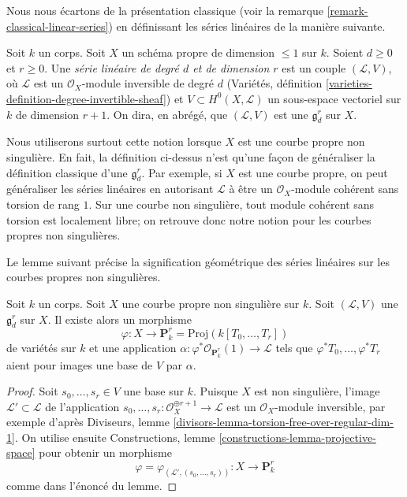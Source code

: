 \noindent
Nous nous écartons de la présentation classique (voir la remarque \ref{remark-classical-linear-series}) en définissant les séries linéaires de la manière suivante.

\begin{definition}
\label{definition-linear-series}
Soit $k$ un corps. Soit $X$ un schéma propre de dimension $\leq 1$ sur $k$. Soient $d \geq 0$ et $r \geq 0$. Une {\it série linéaire de degré $d$ et de dimension $r$} est un couple $(\mathcal{L}, V)$, où $\mathcal{L}$ est un $\mathcal{O}_X$-module inversible de degré $d$ (Variétés, définition \ref{varieties-definition-degree-invertible-sheaf}) et $V \subset H^0(X, \mathcal{L})$ un sous-espace vectoriel sur $k$ de dimension $r + 1$. On dira, en abrégé, que $(\mathcal{L}, V)$ est une {\it $\mathfrak g^r_d$} sur $X$.
\end{definition}

\noindent
Nous utiliserons surtout cette notion lorsque $X$ est une courbe propre non singulière. En fait, la définition ci-dessus n'est qu'une façon de généraliser la définition classique d'une $\mathfrak g^r_d$. Par exemple, si $X$ est une courbe propre, on peut généraliser les séries linéaires en autorisant $\mathcal{L}$ à être un $\mathcal{O}_X$-module cohérent sans torsion de rang $1$. Sur une courbe non singulière, tout module cohérent sans torsion est localement libre; on retrouve donc notre notion pour les courbes propres non singulières.

\medskip\noindent
Le lemme suivant précise la signification géométrique des séries linéaires sur les courbes propres non singulières.

\begin{lemma}
\label{lemma-linear-series}
Soit $k$ un corps. Soit $X$ une courbe propre non singulière sur $k$. Soit $(\mathcal{L}, V)$ une $\mathfrak g^r_d$ sur $X$. Il existe alors un morphisme $$
\varphi : X \longrightarrow \mathbf{P}^r_k = \text{Proj}(k[T_0, \ldots, T_r])
$$ de variétés sur $k$ et une application $\alpha : \varphi^*\mathcal{O}_{\mathbf{P}^r_k}(1) \to \mathcal{L}$ tels que $\varphi^*T_0, \ldots, \varphi^*T_r$ aient pour images une base de $V$ par $\alpha$.
\end{lemma}

\begin{proof}
Soit $s_0, \ldots, s_r \in V$ une base sur $k$. Puisque $X$ est non singulière, l'image $\mathcal{L}' \subset \mathcal{L}$ de l'application $s_0, \ldots, s_r : \mathcal{O}_X^{\oplus r + 1} \to \mathcal{L}$ est un $\mathcal{O}_X$-module inversible, par exemple d'après Diviseurs, lemme \ref{divisors-lemma-torsion-free-over-regular-dim-1}. On utilise ensuite Constructions, lemme \ref{constructions-lemma-projective-space} pour obtenir un morphisme $$
\varphi = \varphi_{(\mathcal{L}', (s_0, \ldots, s_r))} :
X \longrightarrow \mathbf{P}^r_k
$$ comme dans l'énoncé du lemme.
\end{proof}

